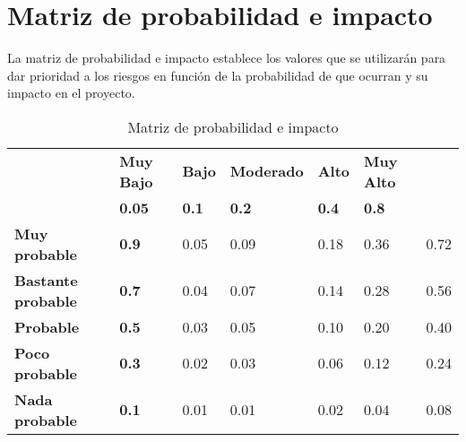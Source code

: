\section{Matriz de probabilidad e impacto}
La matriz de probabilidad e impacto establece los valores que se utilizarán para dar prioridad a los riesgos en función de la probabilidad de que ocurran y su impacto en el proyecto.
\begin{table}[H]
	\centering
	\begin{tabular}{|>{\centering\arraybackslash}m{4cm}|>{\centering\arraybackslash}m{1cm}|>{\centering\arraybackslash}m{1.7cm}|>{\centering\arraybackslash}m{1.5cm}|>{\centering\arraybackslash}m{1.7cm}|>{\centering\arraybackslash}m{1.5cm}|>{\centering\arraybackslash}m{1.7cm}|}
		\hline
		\multicolumn{2}{|c|}{\multirow{3}{*}{\textbf{PROBABILIDAD}}} & \multicolumn{5}{c|}{\textbf{IMPACTO}}                                                                                                                                            \\
		\cline{3-7}
		\multicolumn{2}{|c|}{}                                       & \textbf{Muy Bajo}                     & \textbf{Bajo}            & \textbf{Moderado}         & \textbf{Alto}             & \textbf{Muy Alto}                                     \\
		\cline{3-7}
		\multicolumn{2}{|c|}{}                                       & \textbf{0.05}                         & \textbf{0.1}             & \textbf{0.2}              & \textbf{0.4}              & \textbf{0.8}                                          \\
		\hline
		\textbf{Muy probable}                                        & \textbf{0.9}                          & \cellcolor{green!30}0.05 & \cellcolor{yellow!50}0.09 & \cellcolor{red!50}0.18    & \cellcolor{red!50}0.36    & \cellcolor{red!50}0.72    \\
		\hline
		\textbf{Bastante probable}                                   & \textbf{0.7}                          & \cellcolor{green!30}0.04 & \cellcolor{yellow!50}0.07 & \cellcolor{yellow!50}0.14 & \cellcolor{red!50}0.28    & \cellcolor{red!50}0.56    \\
		\hline
		\textbf{Probable}                                            & \textbf{0.5}                          & \cellcolor{green!30}0.03 & \cellcolor{green!30}0.05  & \cellcolor{yellow!50}0.10 & \cellcolor{red!50}0.20    & \cellcolor{red!50}0.40    \\
		\hline
		\textbf{Poco probable}                                       & \textbf{0.3}                          & \cellcolor{green!30}0.02 & \cellcolor{green!30}0.03  & \cellcolor{yellow!50}0.06 & \cellcolor{yellow!50}0.12 & \cellcolor{red!50}0.24    \\
		\hline
		\textbf{Nada probable}                                       & \textbf{0.1}                          & \cellcolor{green!30}0.01 & \cellcolor{green!30}0.01  & \cellcolor{green!30}0.02  & \cellcolor{yellow!50}0.04 & \cellcolor{yellow!50}0.08 \\
		\hline
	\end{tabular}
	\caption{Matriz de probabilidad e impacto}
\end{table}

